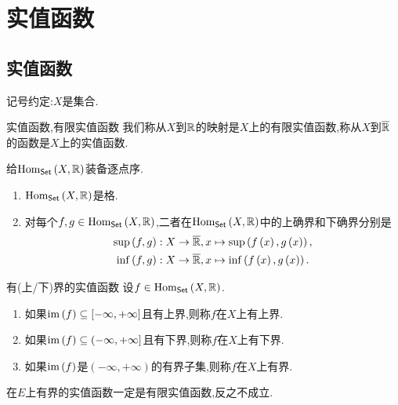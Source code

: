 \chapter{实值函数}

\section{实值函数}

记号约定:$X$是集合.

\begin{definition}{实值函数,有限实值函数}{}
	我们称从$X$到$\mathbb{R}$的映射是$X$上的有限实值函数,称从$X$到$\overline{\mathbb{R}}$的函数是$X$上的实值函数.
\end{definition}

\begin{proposition}{}{}
	给$\operatorname{Hom}_{\mathsf{Set}}\left(X,\mathbb{R}\right)$装备逐点序.
	\begin{enumerate}
		\item $\operatorname{Hom}_{\mathsf{Set}}\left(X,\mathbb{R}\right)$是格.
		\item 对每个$f,g\in\operatorname{Hom}_{\mathsf{Set}}\left(X,\mathbb{R}\right)$,二者在$\operatorname{Hom}_{\mathsf{Set}}\left(X,\mathbb{R}\right)$中的上确界和下确界分别是
		\begin{gather*}
			\sup\left(f,g\right):X\to\overline{\mathbb{R}},x\mapsto\sup\left(f\left(x\right),g\left(x\right)\right),\\
			\inf\left(f,g\right):X\to\overline{\mathbb{R}},x\mapsto\inf\left(f\left(x\right),g\left(x\right)\right).
		\end{gather*}
	\end{enumerate}
\end{proposition}

\begin{definition}{有(上/下)界的实值函数}{}
	设$f\in\operatorname{Hom}_{\mathsf{Set}}\left(X,\mathbb{R}\right)$.
	\begin{enumerate}
		\item 如果$\operatorname{im}\left(f\right)\subseteq\left[-\infty,+\infty\right]$且有上界,则称$f$在$X$上有上界.
		\item 如果$\operatorname{im}\left(f\right)\subseteq\left(-\infty,+\infty\right]$且有下界,则称$f$在$X$上有下界.
		\item 如果$\operatorname{im}\left(f\right)$是$\left(-\infty,+\infty\right)$的有界子集,则称$f$在$X$上有界.
	\end{enumerate}
\end{definition}

\begin{remark}{}{}
	在$E$上有界的实值函数一定是有限实值函数,反之不成立.
\end{remark}